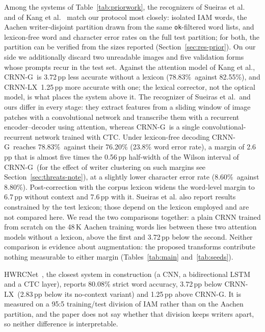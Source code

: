 \documentclass{ws-ijprai}
\newcommand{\ours}{CRNN-LX}            %
\newcommand{\oursnolm}{CRNN-G}         %
\newcommand{\rawwa}{78.83\%}
\newcommand{\rawcer}{8.60\%}
\begin{document}
Among the systems of Table~\ref{tab:priorwork}, the recognizers of
Sueiras et al.~\cite{sueiras2018offline} and of Kang et
al.~\cite{kang2018convolve} match our protocol most closely: isolated
IAM words, the Aachen writer-disjoint partition drawn from the same
\texttt{ok}-filtered word lists, and lexicon-free word and character error
rates on the full test partition; for both, the partition can be verified
from the sizes reported (Section~\ref{sec:res-prior}). On our side we
additionally discard two unreadable images and five validation forms whose
prompts recur in the test set. Against the attention model of Kang et al.,
\oursnolm\ is 3.72\,pp less accurate without a lexicon (\rawwa\ against
82.55\%), and \ours\ 1.25\,pp more accurate with one; the lexical corrector,
not the optical model, is what places the system above it.
The recognizer of Sueiras et al.\ and ours differ in every stage: they
extract features from a sliding window
of image patches with a convolutional network and
transcribe them with a recurrent encoder--decoder using attention,
whereas \oursnolm\ is a single convolutional-recurrent network trained
with CTC. Under lexicon-free decoding \oursnolm\ reaches \rawwa\
against their 76.20\% (23.8\% word error rate), a margin of 2.6\,pp
that is almost five times the 0.56\,pp half-width of the Wilson interval of
\oursnolm\ (for the effect of writer clustering on such margins see
Section~\ref{sec:threats-note}),
at a slightly lower character error rate (\rawcer\ against 8.80\%).
Post-correction with the corpus lexicon widens the word-level margin
to 6.7\,pp without context and
7.6\,pp with it. Sueiras et al. also report results constrained by the test
lexicon; those depend on the lexicon employed and are not compared here. We
read the two comparisons together: a plain CRNN trained from scratch on the
48\,K Aachen training words lies between these two attention models without a
lexicon, above the first and 3.72\,pp below the second. Neither comparison is
evidence about augmentation: the proposed transforms contribute nothing
measurable to either margin (Tables~\ref{tab:main} and~\ref{tab:seeds}).

HWRCNet~\cite{rajesh2022hwrcnet}, the closest system in construction
(a CNN, a bidirectional LSTM and a CTC layer), reports 80.08\% strict
word accuracy, 3.72\,pp below \ours\ (2.83\,pp below its no-context
variant) and 1.25\,pp above \oursnolm. It
is measured on a 95:5 training/test division of IAM rather than on the
Aachen partition, and the paper does not say whether that division keeps
writers apart, so neither difference is interpretable.
\end{document}
